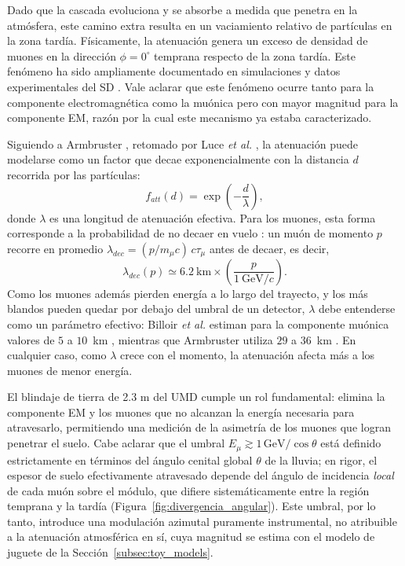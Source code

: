Dado que la cascada evoluciona y se absorbe a medida que penetra en la atmósfera, este camino extra resulta en un vaciamiento relativo de partículas en la zona tardía. Físicamente, la atenuación genera un exceso de densidad de muones en la dirección $\phi = 0^\circ$ temprana respecto de la zona tardía. Este fenómeno ha sido ampliamente documentado en simulaciones y datos experimentales del SD \cite{Pryke1998, BradfieldThesis}. Vale aclarar que este fenómeno ocurre tanto para la componente electromagnética como la muónica pero con mayor magnitud para la componente EM, razón por la cual este mecanismo ya estaba caracterizado.

Siguiendo a Armbruster \cite{Armbruster2018}, retomado por Luce \textit{et al.} \cite{Luce_ICRC2021}, la atenuación puede modelarse como un factor que decae exponencialmente con la distancia $d$ recorrida por las partículas:
\begin{equation}
	f_{att}(d) = \exp\left(-\frac{d}{\lambda}\right),
	\label{eq:atenuacion_armbruster}
\end{equation}
donde $\lambda$ es una longitud de atenuación efectiva. Para los muones, esta forma corresponde a la probabilidad de no decaer en vuelo \cite{Cazon2012}: un muón de momento $p$ recorre en promedio $\lambda_{dec} = (p/m_\mu c)\,c\tau_\mu$ antes de decaer, es decir,
\begin{equation}
	\lambda_{dec}(p) \simeq 6.2~\text{km}\times\left(\frac{p}{1~\mathrm{GeV}/c}\right).
	\label{eq:lambda_decaimiento}
\end{equation}
Como los muones además pierden energía a lo largo del trayecto, y los más blandos pueden quedar por debajo del umbral de un detector, $\lambda$ debe entenderse como un parámetro efectivo: Billoir \textit{et al.} estiman para la componente muónica valores de $5$ a $10$~km \cite{Billoir2002b}, mientras que Armbruster utiliza $29$ a $36$~km \cite{Armbruster2018}. En cualquier caso, como $\lambda$ crece con el momento, la atenuación afecta más a los muones de menor energía.

El blindaje de tierra de 2.3 m del UMD cumple un rol fundamental: elimina la componente EM y los muones que no alcanzan la energía necesaria para atravesarlo, permitiendo una medición de la asimetría de los muones que logran penetrar el suelo. Cabe aclarar que el umbral $E_\mu \gtrsim 1\,\mathrm{GeV}/\cos\theta$ está definido estrictamente en términos del ángulo cenital global $\theta$ de la lluvia; en rigor, el espesor de suelo efectivamente atravesado depende del ángulo de incidencia \textit{local} de cada muón sobre el módulo, que difiere sistemáticamente entre la región temprana y la tardía (Figura~\ref{fig:divergencia_angular}). Este umbral, por lo tanto, introduce una modulación azimutal puramente instrumental, no atribuible a la atenuación atmosférica en sí, cuya magnitud se estima con el modelo de juguete de la Sección~\ref{subsec:toy_models}.

